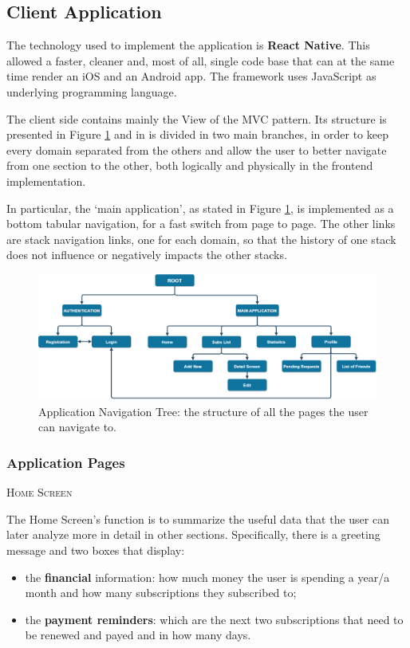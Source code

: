 \documentclass[12pt]{article}
\begin{document}
\subsection{Client Application}
The technology used to implement the application is \textbf{React Native}. This allowed a faster, cleaner and, most of all, single code base that can at the same time render an iOS and an Android app. The framework uses JavaScript as underlying programming language.

The client side contains mainly the View of the MVC pattern. Its structure is presented in Figure \ref{fig:navigationTree} and in is divided in two main branches, in order to keep every domain separated from the others and allow the user to better navigate from one section to the other, both logically and physically in the frontend implementation.

In particular, the `main application', as stated in Figure \ref{fig:navigationTree}, is implemented as a bottom tabular navigation, for a fast switch from page to page. The other links are stack navigation links, one for each domain, so that the history of one stack does not influence or negatively impacts the other stacks.

\begin{figure}[h!]
    \begin{center}
        \includegraphics[width=\textwidth, clip]{../../assets/navigationTree.drawio.png}
    \end{center}
    \caption{Application Navigation Tree: the structure of all the pages the user can navigate to.}
    \label{fig:navigationTree}
\end{figure}

\subsubsection{Application Pages}
{\scshape{Home Screen}}
\vspace{0.2cm}

\noindent The Home Screen's function is to summarize the useful data that the user can later analyze more in detail in other sections. Specifically, there is a greeting message and two boxes that display: \begin{itemize}
    \item the \textbf{financial} information: how much money the user is spending a year/a month and how many subscriptions they subscribed to;
    \item the \textbf{payment reminders}: which are the next two subscriptions that need to be renewed and payed and in how many days.
\end{itemize}
\end{document}
